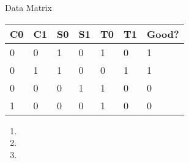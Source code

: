 \documentclass[usenames,dvipsnames]{beamer}
\begin{document}
\begin{frame}{Data Matrix}

	\begin{table}[]
	\begin{tabular}{|l|l||l|l||l|l||l|}
		\hline 
		\rowcolor{white}
		\cellcolor{Lavender}\textbf{C0} & \cellcolor{Lavender}\textbf{C1} & \cellcolor{Lavender}\textbf{S0} & \cellcolor{Lavender}\textbf{S1} & \cellcolor{Lavender}\textbf{T0} & \cellcolor{Lavender}\textbf{T1} & \cellcolor{Tan}\textbf{Good?} \\ \hline 
		\cellcolor{Lavender}0 & \cellcolor{Lavender}0 & \cellcolor{Lavender}1 & \cellcolor{Lavender}0 & \cellcolor{Lavender}1 & \cellcolor{Lavender}0 & \cellcolor{Tan}1 \\
		\cellcolor{Lavender}0 & \cellcolor{Lavender}1 & \cellcolor{Lavender}1 & \cellcolor{Lavender}0 & \cellcolor{Lavender}0 & \cellcolor{Lavender}1 & \cellcolor{Tan}1 \\
		\cellcolor{Lavender}0 & \cellcolor{Lavender}0 & \cellcolor{Lavender}0 & \cellcolor{Lavender}1 & \cellcolor{Lavender}1 & \cellcolor{Lavender}0 & \cellcolor{Tan}0 \\
		\cellcolor{Lavender}1 & \cellcolor{Lavender}0 & \cellcolor{Lavender}0 & \cellcolor{Lavender}0 & \cellcolor{Lavender}1 & \cellcolor{Lavender}0 & \cellcolor{Tan}0 \\ \hline 
	\end{tabular}
\end{table}

\begin{enumerate}
	\item {}
	\item {}
	\item {}
\end{enumerate}

\end{frame}
\end{document}
